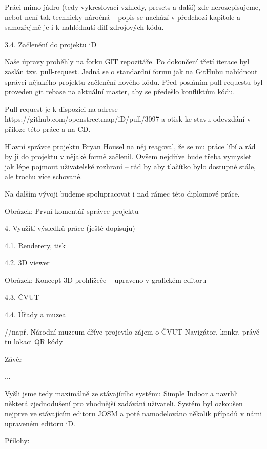 Práci mimo jádro (tedy vykreslovací vzhledy, presets a další) zde nerozepisujeme, neboť není tak technicky náročná – popis se nachází v předchozí kapitole a samozřejmě je i k nahlédnutí diff zdrojových kódů.

3.4. Začlenění do projektu iD



Naše úpravy proběhly na forku GIT repozitáře. Po dokončení třetí iterace byl zaslán tzv. pull-request. Jedná se o standardní formu jak na GitHubu nabídnout správci nějakého projektu začlenění nového kódu. Před posláním pull-requestu byl proveden git rebase na aktuální master, aby se předešlo konfliktům kódu.

Pull request je k dispozici na adrese https://github.com/openstreetmap/iD/pull/3097 a otisk ke stavu odevzdání v příloze této práce a na CD.

Hlavní správce projektu Bryan Housel na něj reagoval, že se mu práce líbí a rád by jí do projektu v nějaké formě začlenil. Ovšem nejdříve bude třeba vymyslet jak lépe pojmout uživatelské rozhraní – rád by aby tlačítko bylo dostupné stále, ale trochu více schované.

Na dalším vývoji budeme spolupracovat i nad rámec této diplomové práce.



Obrázek: První komentář správce projektu





4. Využití výsledků práce  (ještě dopisuju)



4.1. Renderery, tisk



4.2. 3D viewer





Obrázek: Koncept 3D prohlížeče – upraveno v grafickém editoru

4.3. ČVUT



4.4. Úřady a muzea



//např. Národní muzeum dříve projevilo zájem o ČVUT Navigátor, konkr. právě tu lokaci QR kódy





Závěr



...

Vyšli jsme tedy maximálně ze stávajícího systému Simple Indoor a navrhli některá zjednodušení pro vhodnější zadávání uživateli. Systém byl ozkoušen nejprve ve stávajícím editoru JOSM a poté namodelováno několik případů v námi upraveném editoru iD.

Přílohy:


